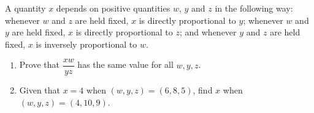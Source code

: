 A quantity $x$ depends on positive quantities $w$, $y$ and $z$ in the following way: whenever $w$ and $z$ are held fixed, $x$ is directly proportional to $y$; whenever $w$ and $y$ are held fixed, $x$ is directly proportional to $z$; and whenever $y$ and $z$ are held fixed, $x$ is inversely proportional to $w$.
\begin{enumerate}
\item[(a)] Prove that $\dfrac{xw}{yz}$ has the same value for all $w,y,z$.
\item[(b)] Given that $x=4$ when $(w,y,z)=(6,8,5)$, find $x$ when $(w,y,z)=(4,10,9)$.
\end{enumerate}
